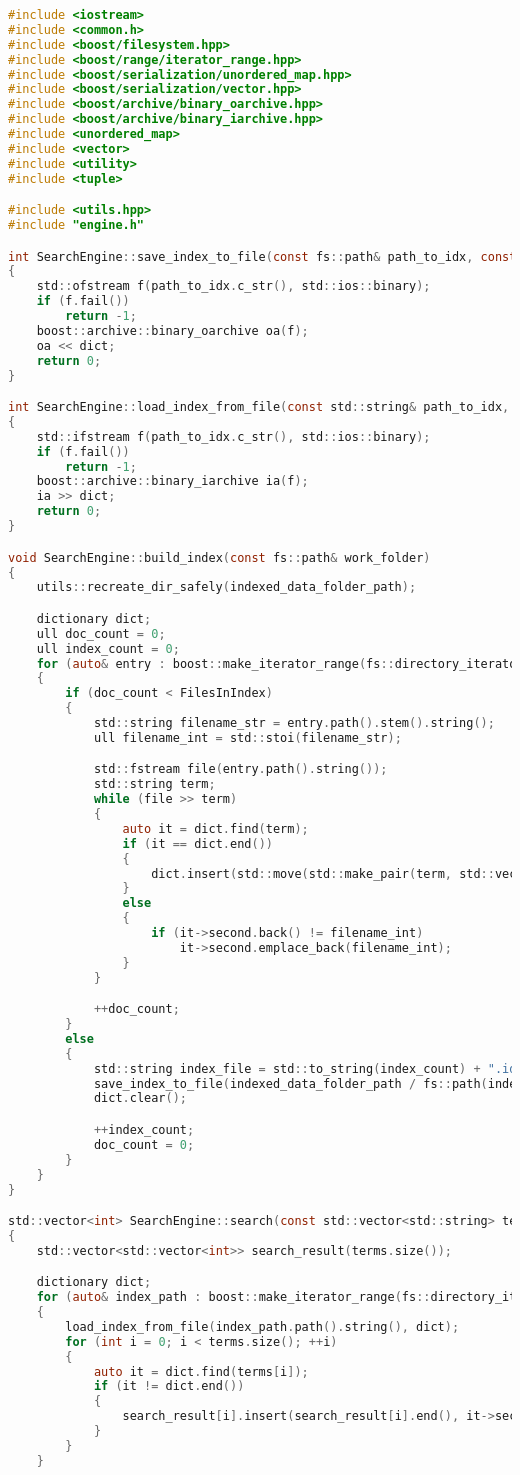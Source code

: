 \begin{lstlisting}[language=C]
#include <iostream>
#include <common.h>
#include <boost/filesystem.hpp>
#include <boost/range/iterator_range.hpp>
#include <boost/serialization/unordered_map.hpp>
#include <boost/serialization/vector.hpp>
#include <boost/archive/binary_oarchive.hpp> 
#include <boost/archive/binary_iarchive.hpp> 
#include <unordered_map>
#include <vector>
#include <utility>
#include <tuple>

#include <utils.hpp>
#include "engine.h"

int SearchEngine::save_index_to_file(const fs::path& path_to_idx, const dictionary& dict)
{
	std::ofstream f(path_to_idx.c_str(), std::ios::binary);
	if (f.fail()) 
		return -1;
	boost::archive::binary_oarchive oa(f);
	oa << dict;
	return 0;
}

int SearchEngine::load_index_from_file(const std::string& path_to_idx, dictionary& dict)
{
	std::ifstream f(path_to_idx.c_str(), std::ios::binary);
	if (f.fail())
		return -1;
	boost::archive::binary_iarchive ia(f);
	ia >> dict;
	return 0;
}

void SearchEngine::build_index(const fs::path& work_folder)
{
	utils::recreate_dir_safely(indexed_data_folder_path);

	dictionary dict;
	ull doc_count = 0;
	ull index_count = 0;
	for (auto& entry : boost::make_iterator_range(fs::directory_iterator(tokenized_data_folder_path), {}))
	{
		if (doc_count < FilesInIndex)
		{
			std::string filename_str = entry.path().stem().string();
			ull filename_int = std::stoi(filename_str);

			std::fstream file(entry.path().string());
			std::string term;
			while (file >> term)
			{
				auto it = dict.find(term);
				if (it == dict.end())
				{
					dict.insert(std::move(std::make_pair(term, std::vector<ull>{filename_int})));
				}
				else
				{
					if (it->second.back() != filename_int)
						it->second.emplace_back(filename_int);
				}
			}

			++doc_count;
		}
		else
		{
			std::string index_file = std::to_string(index_count) + ".idx";
			save_index_to_file(indexed_data_folder_path / fs::path(index_file), dict);
			dict.clear();

			++index_count;
			doc_count = 0;
		}
	}
}

std::vector<int> SearchEngine::search(const std::vector<std::string> terms)
{
	std::vector<std::vector<int>> search_result(terms.size());

	dictionary dict;
	for (auto& index_path : boost::make_iterator_range(fs::directory_iterator(indexed_data_folder_path), {}))
	{
		load_index_from_file(index_path.path().string(), dict);
		for (int i = 0; i < terms.size(); ++i)
		{
			auto it = dict.find(terms[i]);
			if (it != dict.end())
			{
				search_result[i].insert(search_result[i].end(), it->second.begin(), it->second.end());
			}
		}
	}


\end{lstlisting}
